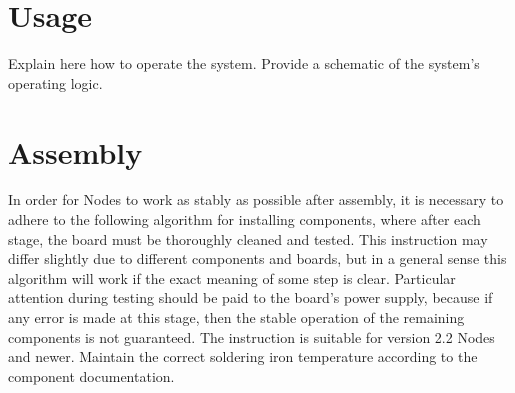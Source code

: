 \documentclass[10pt]{datasheet}
\begin{document}
\section{Usage}
Explain here how to operate the system. Provide a schematic of the system's operating logic.
\newpage
\section{Assembly}
In order for Nodes to work as stably as possible after assembly, it is necessary to adhere to the following algorithm for installing components, where after each stage, the board must be thoroughly cleaned and tested. This instruction may differ slightly due to different components and boards, but in a general sense this algorithm will work if the exact meaning of some step is clear. Particular attention during testing should be paid to the board's power supply, because if any error is made at this stage, then the stable operation of the remaining components is not guaranteed. The instruction is suitable for version 2.2 Nodes and newer. Maintain the correct soldering iron temperature according to the component documentation.
\end{document}
